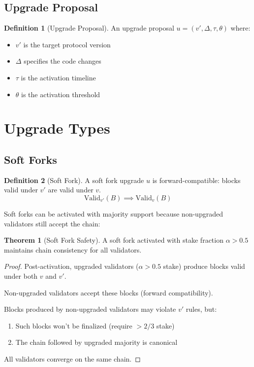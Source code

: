 \documentclass[11pt,a4paper]{article}
\theoremstyle{definition}
\newtheorem{definition}{Definition}[section]
\newtheorem{theorem}{Theorem}[section]
\theoremstyle{remark}
\begin{document}
\subsection{Upgrade Proposal}

\begin{definition}[Upgrade Proposal]
An upgrade proposal $u = (v', \Delta, \tau, \theta)$ where:
\begin{itemize}
    \item $v'$ is the target protocol version
    \item $\Delta$ specifies the code changes
    \item $\tau$ is the activation timeline
    \item $\theta$ is the activation threshold
\end{itemize}
\end{definition}

\section{Upgrade Types}

\subsection{Soft Forks}

\begin{definition}[Soft Fork]
A soft fork upgrade $u$ is forward-compatible: blocks valid under $v'$ are valid under $v$.
\begin{equation}
    \text{Valid}_{v'}(B) \implies \text{Valid}_v(B)
\end{equation}
\end{definition}

Soft forks can be activated with majority support because non-upgraded validators still accept the chain:

\begin{theorem}[Soft Fork Safety]
A soft fork activated with stake fraction $\alpha > 0.5$ maintains chain consistency for all validators.
\end{theorem}

\begin{proof}
Post-activation, upgraded validators ($\alpha > 0.5$ stake) produce blocks valid under both $v$ and $v'$.

Non-upgraded validators accept these blocks (forward compatibility).

Blocks produced by non-upgraded validators may violate $v'$ rules, but:
\begin{enumerate}
    \item Such blocks won't be finalized (require $> 2/3$ stake)
    \item The chain followed by upgraded majority is canonical
\end{enumerate}

All validators converge on the same chain.
\end{proof}
\end{document}
